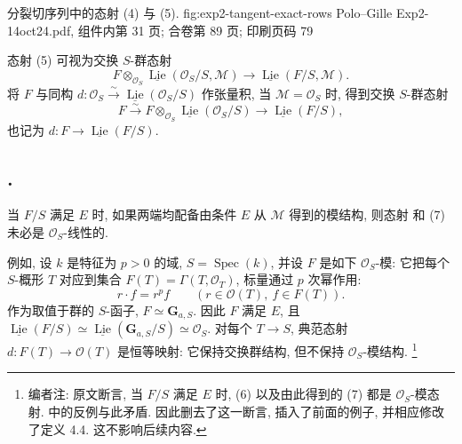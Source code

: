   {分裂切序列中的态射 (4) 与 (5).}
  {fig:exp2-tangent-exact-rows}
  {Polo--Gille Exp2-14oct24.pdf, 组件内第 31 页; 合卷第 89 页; 印刷页码 79}

态射 (5) 可视为交换 \(S\)-群态射
\begin{equation}
 F\otimes_{\mathcal O_S}
 \underline{\operatorname{Lie}}(\mathcal O_S/S,\mathcal M)
 \longrightarrow
 \underline{\operatorname{Lie}}(F/S,\mathcal M).
 \tag{6}\label{sga3:ii:subsection:4-3-2:equation:6}
\end{equation}
将 \(F\) 与同构 \(d:\mathcal O_S\xrightarrow{\sim}
\underline{\operatorname{Lie}}(\mathcal O_S/S)\) 作张量积,
当 \(\mathcal M=\mathcal O_S\) 时, 得到交换 \(S\)-群态射
\begin{equation}
 F\xrightarrow{\sim}
 F\otimes_{\mathcal O_S}
 \underline{\operatorname{Lie}}(\mathcal O_S/S)
 \longrightarrow \underline{\operatorname{Lie}}(F/S),
 \tag{7}\label{sga3:ii:subsection:4-3-2:equation:7}
\end{equation}
也记为 \(d:F\to\underline{\operatorname{Lie}}(F/S)\).

\subsection*{.}
当 \(F/S\) 满足 \(E\) 时, 如果两端均配备由条件 \(E\) 从 \(\mathcal M\)
得到的模结构, 则态射  和 (7)
未必是 \(\mathcal O_S\)-线性的.

例如, 设 \(k\) 是特征为 \(p>0\) 的域, \(S=\operatorname{Spec}(k)\),
并设 \(F\) 是如下 \(\mathcal O_S\)-模: 它把每个 \(S\)-概形 \(T\)
对应到集合 \(F(T)=\Gamma(T,\mathcal O_T)\), 标量通过 \(p\) 次幂作用:
\[
 r\cdot f=r^pf
 \qquad(r\in\mathcal O(T),\ f\in F(T)).
\]
作为取值于群的 \(S\)-函子, \(F\simeq\mathbf G_{a,S}\).
因此 \(F\) 满足 \(E\), 且
\(\underline{\operatorname{Lie}}(F/S)\simeq
\underline{\operatorname{Lie}}(\mathbf G_{a,S}/S)\simeq\mathcal O_S\).
对每个 \(T\to S\), 典范态射 \(d:F(T)\to\mathcal O(T)\) 是恒等映射:
它保持交换群结构, 但不保持 \(\mathcal O_S\)-模结构.
\footnote{编者注: 原文断言, 当 \(F/S\) 满足 \(E\) 时,
(6) 以及由此得到的 (7) 都是 \(\mathcal O_S\)-模态射.
 中的反例与此矛盾.
因此删去了这一断言, 插入了前面的例子, 并相应修改了定义 4.4.
这不影响后续内容.}

